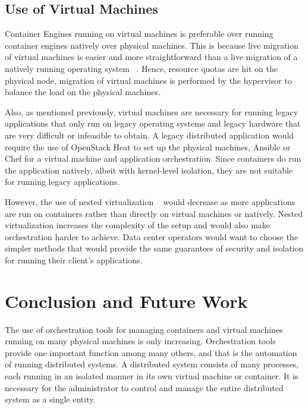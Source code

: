 \documentclass[10pt,twocolumn]{article}
\begin{document}
\subsection{Use of Virtual Machines}

Container Engines running on virtual machines is preferable over running container engines natively over physical machines.
This is because live migration of virtual machines is easier and more straightforward than a live migration of a natively running operating system ~\cite{live_migration}.
Hence, resource quotas are hit on the physical node, migration of virtual machines is performed by the hypervisor to balance the load on the physical machines.

Also, as mentioned previously, virtual machines are necessary for running legacy applications that only run on legacy operating systems and legacy hardware that are very difficult or infeasible to obtain.
A legacy distributed application would require the use of OpenStack Heat to set up the physical machines, Ansible or Chef for a virtual machine and application orchestration.
Since containers do run the application natively, albeit with kernel-level isolation, they are not suitable for running legacy applications.

However, the use of nested virtualization ~\cite{nested} would decrease as more applications are run on containers rather than directly on virtual machines or natively.
Nested virtualization increases the complexity of the setup and would also make orchestration harder to achieve.
Data center operators would want to choose the simpler methods that would provide the same guarantees of security and isolation for running their client's applications.

\section{Conclusion and Future Work}

The use of orchestration tools for managing containers and virtual machines running on many physical machines is only increasing.
Orchestration tools provide one important function among many others, and that is the automation of running distributed systems.
A distributed system consists of many processes, each running in an isolated manner in its own virtual machine or container.
It is necessary for the administrator to control and manage the entire distributed system as a single entity.
\end{document}
